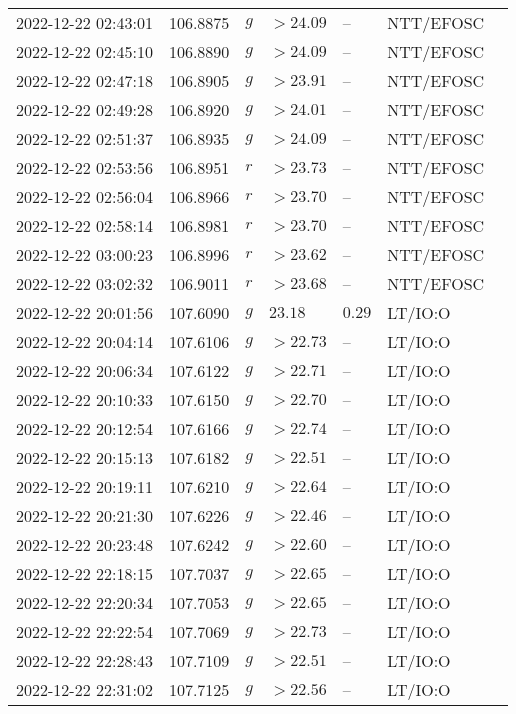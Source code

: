 \documentclass{nature_plusfigure}
\begin{document}
\begin{supplement}
\begin{center}
\begin{longtable}{lllllll}
2022-12-22 02:43:01 & 106.8875 & $g$ & $>24.09$ & -- & NTT/EFOSC &  \\ 
2022-12-22 02:45:10 & 106.8890 & $g$ & $>24.09$ & -- & NTT/EFOSC &  \\ 
2022-12-22 02:47:18 & 106.8905 & $g$ & $>23.91$ & -- & NTT/EFOSC &  \\ 
2022-12-22 02:49:28 & 106.8920 & $g$ & $>24.01$ & -- & NTT/EFOSC &  \\ 
2022-12-22 02:51:37 & 106.8935 & $g$ & $>24.09$ & -- & NTT/EFOSC &  \\ 
2022-12-22 02:53:56 & 106.8951 & $r$ & $>23.73$ & -- & NTT/EFOSC &  \\ 
2022-12-22 02:56:04 & 106.8966 & $r$ & $>23.70$ & -- & NTT/EFOSC &  \\ 
2022-12-22 02:58:14 & 106.8981 & $r$ & $>23.70$ & -- & NTT/EFOSC &  \\ 
2022-12-22 03:00:23 & 106.8996 & $r$ & $>23.62$ & -- & NTT/EFOSC &  \\ 
2022-12-22 03:02:32 & 106.9011 & $r$ & $>23.68$ & -- & NTT/EFOSC &  \\ 
2022-12-22 20:01:56 & 107.6090 & $g$ & $23.18$ & $0.29$ & LT/IO:O &  \\ 
2022-12-22 20:04:14 & 107.6106 & $g$ & $>22.73$ & -- & LT/IO:O &  \\ 
2022-12-22 20:06:34 & 107.6122 & $g$ & $>22.71$ & -- & LT/IO:O &  \\ 
2022-12-22 20:10:33 & 107.6150 & $g$ & $>22.70$ & -- & LT/IO:O &  \\ 
2022-12-22 20:12:54 & 107.6166 & $g$ & $>22.74$ & -- & LT/IO:O &  \\ 
2022-12-22 20:15:13 & 107.6182 & $g$ & $>22.51$ & -- & LT/IO:O &  \\ 
2022-12-22 20:19:11 & 107.6210 & $g$ & $>22.64$ & -- & LT/IO:O &  \\ 
2022-12-22 20:21:30 & 107.6226 & $g$ & $>22.46$ & -- & LT/IO:O &  \\ 
2022-12-22 20:23:48 & 107.6242 & $g$ & $>22.60$ & -- & LT/IO:O &  \\ 
2022-12-22 22:18:15 & 107.7037 & $g$ & $>22.65$ & -- & LT/IO:O &  \\ 
2022-12-22 22:20:34 & 107.7053 & $g$ & $>22.65$ & -- & LT/IO:O &  \\ 
2022-12-22 22:22:54 & 107.7069 & $g$ & $>22.73$ & -- & LT/IO:O &  \\ 
2022-12-22 22:28:43 & 107.7109 & $g$ & $>22.51$ & -- & LT/IO:O &  \\ 
2022-12-22 22:31:02 & 107.7125 & $g$ & $>22.56$ & -- & LT/IO:O &  \\ 

\end{longtable}
\end{center}
\end{supplement}
\end{document}

